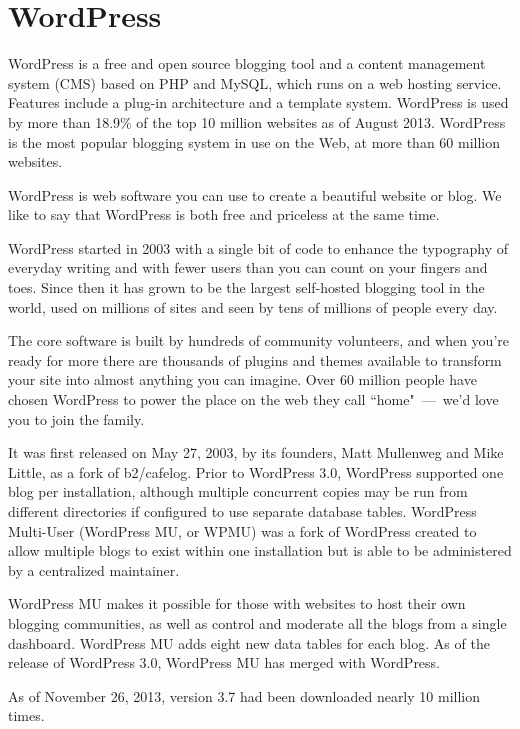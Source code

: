 \chapter{WordPress}



WordPress is a free and open source blogging tool and a content management system (CMS) based on PHP and MySQL, which runs on a web hosting service. Features include a plug-in architecture and a template system. WordPress is used by more than 18.9\% of the top 10 million websites as of August 2013. WordPress is the most popular blogging system in use on the Web, at more than 60 million websites.

WordPress is web software you can use to create a beautiful website or blog. We like to say that WordPress is both free and priceless at the same time.

WordPress started in 2003 with a single bit of code to enhance the typography of everyday writing and with fewer users than you can count on your fingers and toes. Since then it has grown to be the largest self-hosted blogging tool in the world, used on millions of sites and seen by tens of millions of people every day.

The core software is built by hundreds of community volunteers, and when you're ready for more there are thousands of plugins and themes available to transform your site into almost anything you can imagine. Over 60 million people have chosen WordPress to power the place on the web they call ``home"~—~we'd love you to join the family.

It was first released on May 27, 2003, by its founders, Matt Mullenweg and Mike Little, as a fork of b2/cafelog. Prior to WordPress 3.0, WordPress supported one blog per installation, although multiple concurrent copies may be run from different directories if configured to use separate database tables. WordPress Multi-User (WordPress MU, or WPMU) was a fork of WordPress created to allow multiple blogs to exist within one installation but is able to be administered by a centralized maintainer. 

WordPress MU makes it possible for those with websites to host their own blogging communities, as well as control and moderate all the blogs from a single dashboard. WordPress MU adds eight new data tables for each blog.
As of the release of WordPress 3.0, WordPress MU has merged with WordPress.

As of November 26, 2013, version 3.7 had been downloaded nearly 10 million times.





